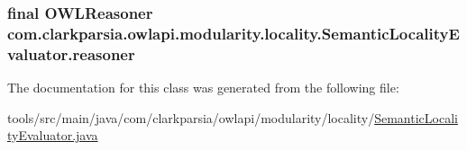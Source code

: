 \hypertarget{classcom_1_1clarkparsia_1_1owlapi_1_1modularity_1_1locality_1_1_semantic_locality_evaluator_a6761f79cd9080669e2d4adc25bbf77f9}{
\subsubsection[{reasoner}]{\setlength{\rightskip}{0pt plus 5cm}final {\bf O\-W\-L\-Reasoner} com.\-clarkparsia.\-owlapi.\-modularity.\-locality.\-Semantic\-Locality\-Evaluator.\-reasoner\hspace{0.3cm}{\ttfamily [protected]}}}\label{classcom_1_1clarkparsia_1_1owlapi_1_1modularity_1_1locality_1_1_semantic_locality_evaluator_a6761f79cd9080669e2d4adc25bbf77f9}


The documentation for this class was generated from the following file\-:\begin{DoxyCompactItemize}
\item 
tools/src/main/java/com/clarkparsia/owlapi/modularity/locality/\hyperlink{_semantic_locality_evaluator_8java}{Semantic\-Locality\-Evaluator.\-java}\end{DoxyCompactItemize}
